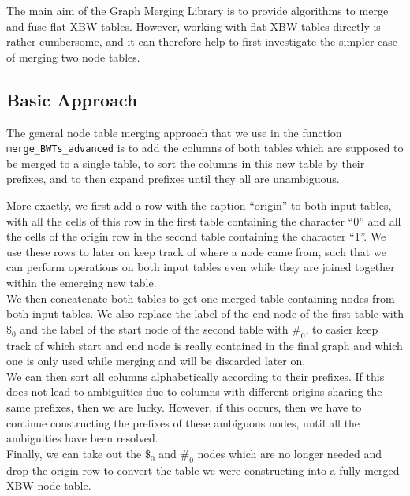 \documentclass[a4paper,12pt,twoside,BCOR=10mm]{scrbook}
\begin{document}
The main aim of the Graph Merging Library is to provide algorithms 
to merge and fuse flat XBW tables. 
However, working with flat XBW tables directly is rather cumbersome, 
and it can therefore help to first investigate the simpler case 
of merging two node tables.

\subsection{Basic Approach}

The general node table merging approach that we use 
in the function \texttt{merge\_BWTs\_advanced} 
is to add the columns of both tables which are supposed to be merged to a single table, 
to sort the columns in this new table by their prefixes, 
and to then expand prefixes until they all are unambiguous.

More exactly, we first add a row with the caption “origin” to both input tables, 
with all the cells of this row in the first table containing the character “0” and 
all the cells of the origin row in the second table containing the character “1”. 
We use these rows to later on keep track of where a node came from, 
such that we can perform operations on both input tables even while 
they are joined together within the emerging new table. \\
We then concatenate both tables to get one merged table containing 
nodes from both input tables. 
We also replace the label of the end node of the first table with $\$_0$ and 
the label of the start node of the second table with $\#_0$, to easier keep track 
of which start and end node is really contained in the final graph 
and which one is only used while merging and will be discarded later on. \\
We can then sort all columns alphabetically according to their prefixes. 
If this does not lead to ambiguities due to columns with different origins 
sharing the same prefixes, then we are lucky. However, if this occurs, 
then we have to continue constructing the prefixes of these ambiguous nodes, 
until all the ambiguities have been resolved. \\
Finally, we can take out the $\$_0$ and $\#_0$ nodes which are no longer needed 
and drop the origin row to convert the table we were constructing into 
a fully merged XBW node table.


%
%
\end{document}
